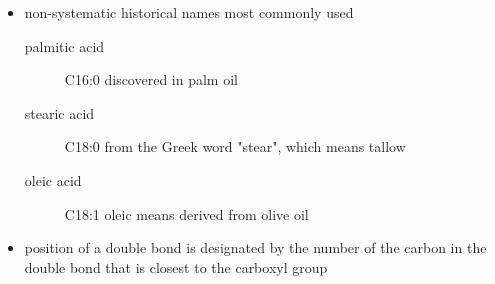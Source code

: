 \documentclass{scrartcl}
\begin{document}

\begin{itemize}
\item non-systematic historical names most commonly used
\begin{description}
\item[{palmitic acid}] C16:0 discovered in palm oil
\item[{stearic acid}] C18:0 from the Greek word "stear", which means tallow
\item[{oleic acid}] C18:1 oleic means derived from olive oil
\end{description}
\item position of a double bond is designated by the number of the carbon in the double bond that is closest to the carboxyl group
\end{itemize}
\end{document}
